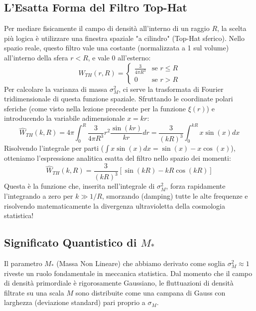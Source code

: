 \documentclass[11pt,a4paper]{report}
\begin{document}
\subsection{L'Esatta Forma del Filtro Top-Hat}
Per mediare fisicamente il campo di densità all'interno di un raggio $R$, la scelta più logica è utilizzare una finestra spaziale "a cilindro" (Top-Hat sferico). Nello spazio reale, questo filtro vale una costante (normalizzata a 1 sul volume) all'interno della sfera $r < R$, e vale 0 all'esterno:
\begin{equation}
W_{TH}(r, R) = \begin{cases} 
\frac{3}{4\pi R^3} & \text{se } r \leq R \\
0 & \text{se } r > R 
\end{cases}
\end{equation}
Per calcolare la varianza di massa $\sigma_M^2$, ci serve la trasformata di Fourier tridimensionale di questa funzione spaziale. 
Sfruttando le coordinate polari sferiche (come visto nella lezione precedente per la funzione $\xi(r)$) e introducendo la variabile adimensionale $x = kr$:
\begin{equation}
\hat{W}_{TH}(k, R) = 4\pi \int_0^R \frac{3}{4\pi R^3} r^2 \frac{\sin(kr)}{kr} dr = \frac{3}{(kR)^3} \int_0^{kR} x \sin(x) dx
\end{equation}
Risolvendo l'integrale per parti ($\int x \sin(x) dx = \sin(x) - x\cos(x)$), otteniamo l'espressione analitica esatta del filtro nello spazio dei momenti:
\begin{equation}
\hat{W}_{TH}(k, R) = \frac{3}{(kR)^3} \left[ \sin(kR) - kR\cos(kR) \right]
\end{equation}
Questa è la funzione che, inserita nell'integrale di $\sigma_M^2$, forza rapidamente l'integrando a zero per $k \gg 1/R$, smorzando (damping) tutte le alte frequenze e risolvendo matematicamente la divergenza ultravioletta della cosmologia statistica!

\subsection{Significato Quantistico di $M_*$}
Il parametro $M_*$ (Massa Non Lineare) che abbiamo derivato come soglia $\sigma_M^2 \approx 1$ riveste un ruolo fondamentale in meccanica statistica. 
Dal momento che il campo di densità primordiale è rigorosamente Gaussiano, le fluttuazioni di densità filtrate su una scala $M$ sono distribuite come una campana di Gauss con larghezza (deviazione standard) pari proprio a $\sigma_M$. 
\end{document}
